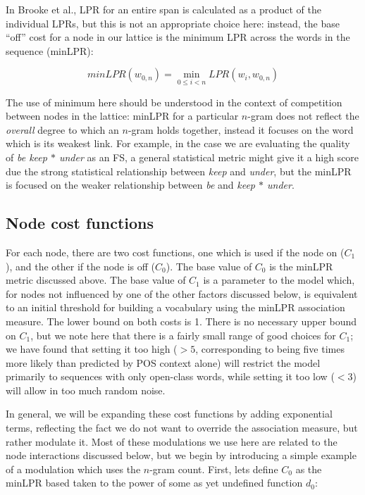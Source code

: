 \documentclass[11pt]{article}
\makeatletter
\def \al {al.\@ }
\newcommand{\gap}{$*$\xspace}
\newcommand{\ex}[1]{\textit{#1}\xspace}
\makeatother
\begin{document}
In Brooke et \al {}, LPR for an entire span is calculated as a product of the individual LPRs, but this is not an appropriate choice here: instead, the base ``off'' cost for a node in our lattice is the minimum LPR across the words in the sequence (minLPR):

\begin{displaymath}
minLPR(w_{0,n}) = \min_{0 \leq i < n }{LPR(w_i,w_{0,n})}
\end{displaymath}

The use of minimum here should be understood in the context of competition between nodes in the lattice: minLPR for a particular $n$-gram does not reflect the \emph{overall}
degree to which an $n$-gram holds together, instead it focuses on the word which is its weakest link. For example, in the case we are evaluating the quality of \ex{be keep \gap under} as an FS, a general statistical metric might give it a high score due the strong statistical relationship between \ex{keep} and \ex{under}, but the minLPR is focused on the weaker relationship between \ex{be} and \ex{keep \gap under}.


\subsection{Node cost functions}

For each node, there are two cost functions, one which is used if the node on ($C_{1}$), and the other if the node is off ($C_{0}$). The base value of $C_{0}$ is the minLPR metric discussed above. The base value of $C_{1}$ is a parameter to the model which, for nodes not influenced by one of the other factors discussed below, is equivalent to an initial threshold for building a vocabulary using the minLPR association measure. The lower bound on both costs is 1. There is no necessary upper bound on $C_{1}$, but we note here that there is a fairly small range of good choices for $C_{1}$; we have found that setting it too high ($>5$, corresponding to being five times more likely than predicted by POS context alone) will restrict the model primarily to sequences with only open-class words, while setting it too low ($<3$) will allow in too much random noise.

In general, we will be expanding these cost functions by adding exponential terms, reflecting the fact we do not want to override the association measure, but rather modulate it. Most of these modulations we use here are related to the node interactions discussed below, but we begin by introducing a simple example of a modulation which uses the $n$-gram count. First, lets define $C_0$ as the minLPR based taken to the power of some as yet undefined function $d_0$:
\end{document}
